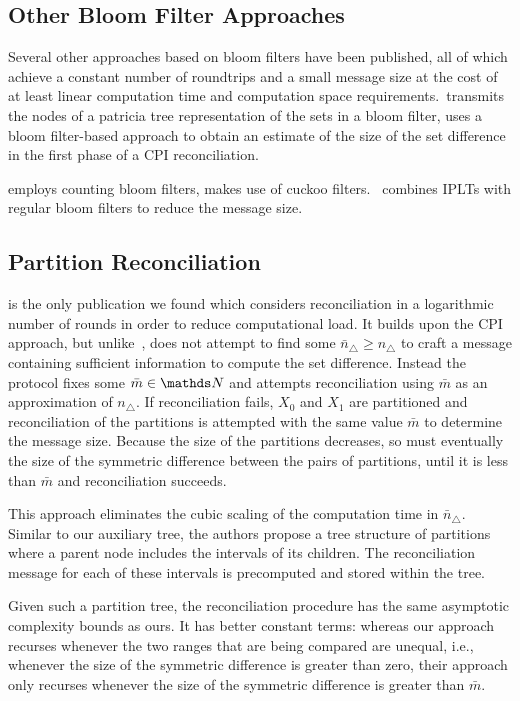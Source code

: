 \subsection{Other Bloom Filter Approaches}

Several other approaches based on bloom filters have been published, all of which achieve a constant number of roundtrips and a small message size at the cost of at least linear computation time and computation space requirements.\cite{byers2002fast}~transmits the nodes of a patricia tree representation of the sets in a bloom filter, \cite{tian2011exact} uses a bloom filter-based approach to obtain an estimate of the size of the set difference in the first phase of a CPI reconciliation.

\cite{guo2012set} employs counting bloom filters, \cite{luo2019set} makes use of cuckoo filters. \cite{ozisik2019graphene}~combines IPLTs with regular bloom filters to reduce the message size.

\subsection{Partition Reconciliation}

\cite{minsky2002practical} is the only publication we found which considers reconciliation in a logarithmic number of rounds in order to reduce computational load. It builds upon the CPI approach, but unlike~\cite{minsky2003set}, does not attempt to find some $\bar{n}_{\triangle} \geq n_{\triangle}$ to craft a message containing sufficient information to compute the set difference. Instead the protocol fixes some $\bar{m} \in \N$ and attempts reconciliation using $\bar{m}$ as an approximation of $n_{\triangle}$. If reconciliation fails, $X_0$ and $X_1$ are partitioned and reconciliation of the partitions is attempted with the same value $\bar{m}$ to determine the message size. Because the size of the partitions decreases, so must eventually the size of the symmetric difference between the pairs of partitions, until it is less than $\bar{m}$ and reconciliation succeeds.

This approach eliminates the cubic scaling of the computation time in $\bar{n}_{\triangle}$. Similar to our auxiliary tree, the authors propose a tree structure of partitions where a parent node includes the intervals of its children. The reconciliation message for each of these intervals is precomputed and stored within the tree.

Given such a partition tree, the reconciliation procedure has the same asymptotic complexity bounds as ours. It has better constant terms: whereas our approach recurses whenever the two ranges that are being compared are unequal, i.e., whenever the size of the symmetric difference is greater than zero, their approach only recurses whenever the size of the symmetric difference is greater than $\bar{m}$.

